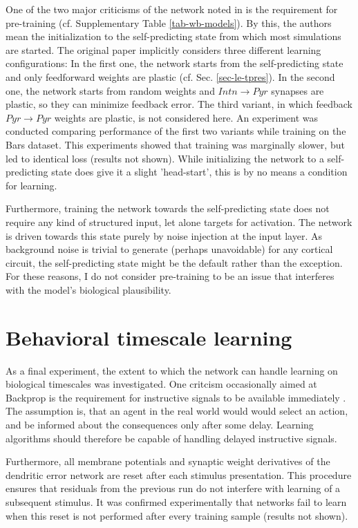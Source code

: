 One of the two major criticisms of the network noted in \citep{whittington2019theories} is the requirement for
pre-training (cf. Supplementary Table \ref{tab-wb-models}). By this, the authors mean the initialization to the self-predicting
state from which most simulations are started. The original paper implicitly considers three different learning
configurations: In the first one, the network starts from the self-predicting state and only feedforward weights are
plastic (cf. Sec. \ref{sec-le-tpres}). In the second one, the network starts from random weights and $Intn \rightarrow
    Pyr$ synapses are plastic, so they can minimize feedback error. The third variant, in which feedback $Pyr \rightarrow
    Pyr$ weights are plastic, is not considered here. An experiment was conducted comparing performance of the first two
variants while training on the Bars dataset. This experiments showed that training was marginally slower, but led to
identical loss (results not shown). While initializing the network to a self-predicting state does give it a slight
'head-start', this is by no means a condition for learning.

Furthermore, training the network towards the self-predicting state does not require any kind of structured input, let
alone targets for activation. The network is driven towards this state purely by noise injection at the input layer. As
background noise is trivial to generate (perhaps unavoidable) for any cortical circuit, the self-predicting state might
be the default rather than the exception. For these reasons, I do not consider pre-training to be an issue that
interferes with the model's biological plausibility.


\section{Behavioral timescale learning}

As a final experiment, the extent to which the network can handle learning on biological timescales was investigated.
One critcism occasionally aimed at Backprop is the requirement for instructive signals to be available immediately
\citep{Bartunov2018}. The assumption is, that an agent in the real world would would select an action, and be informed
about the consequences only after some delay. Learning algorithms should therefore be capable of handling delayed
instructive signals.

Furthermore, all membrane potentials and synaptic weight derivatives of the dendritic error network are reset after each
stimulus presentation. This procedure ensures that residuals from the previous run do not interfere with learning of a
subsequent stimulus. It was confirmed experimentally that networks fail to learn when this reset is not performed after
every training sample (results not shown).

